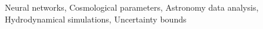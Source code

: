 \documentclass[]{article}
\begin{document}
Neural networks, Cosmological parameters, Astronomy data analysis, Hydrodynamical simulations, Uncertainty bounds
\end{document}
